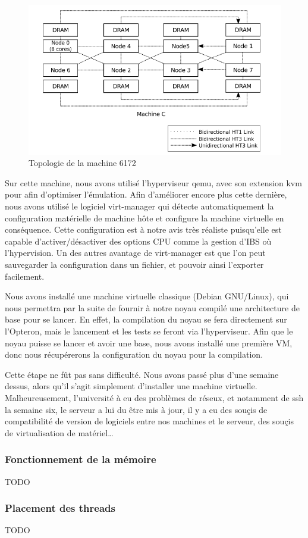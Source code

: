     \begin{figure}[H]
      \includegraphics[scale=0.4]{img/numa_topology.png}
      \caption{Topologie de la machine 6172}
      \label{f:numa_topology}
    \end{figure}

    Sur cette machine, nous avons utilisé l'hyperviseur qemu, avec son extension
    kvm pour afin d'optimiser l'émulation. Afin d'améliorer encore plus cette
    dernière, nous avons utilisé le logiciel virt-manager qui détecte
    automatiquement la configuration matérielle de machine hôte et configure la
    machine virtuelle en conséquence. Cette configuration est à notre avis très
    réaliste puisqu'elle est capable d'activer/désactiver des options CPU comme
    la gestion d'IBS où l'hypervision. Un des autres avantage de virt-manager
    est que l'on peut sauvegarder la configuration dans un fichier, et pouvoir
    ainsi l'exporter facilement.

    Nous avons installé une machine virtuelle classique (Debian GNU/Linux), qui
    nous permettra par la suite de fournir à notre noyau compilé une
    architecture de base pour se lancer. En effet, la compilation du noyau se
    fera directement sur l'Opteron, mais le lancement et les tests se feront via
    l'hyperviseur. Afin que le noyau puisse se lancer et avoir une base, nous
    avons installé une première VM, donc nous récupérerons la configuration du
    noyau pour la compilation.

    Cette étape ne fût pas sans difficulté. Nous avons passé plus d'une semaine
    dessus, alors qu'il s'agit simplement d'installer une machine
    virtuelle. Malheureusement, l'université à eu des problèmes de réseux, et
    notamment de ssh la semaine six, le serveur a lui du être mis à jour, il y a
    eu des souçis de compatibilité de version de logiciels entre nos machines et
    le serveur, des souçis de virtualisation de matériel\ldots


  \subsubsection{Fonctionnement de la mémoire}
  
    TODO


  \subsubsection{Placement des threads}
    TODO

